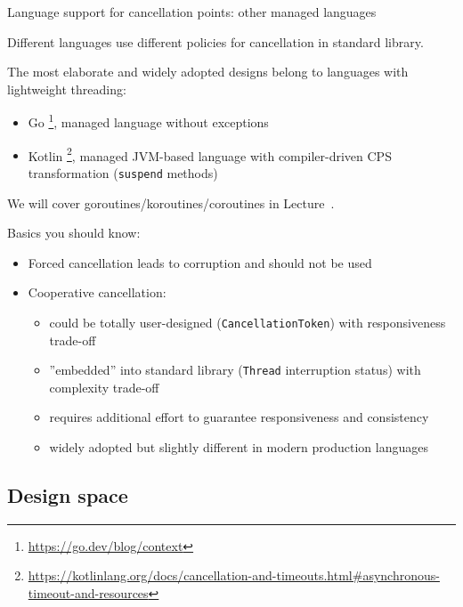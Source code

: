 \begin{frame}[t]{Language support for cancellation points: other managed languages}

Different languages use different policies for cancellation in standard library.

\pause

The most elaborate and widely adopted designs belong to languages with lightweight threading:
\begin{itemize}
    \item Go \footnote{\tiny\url{https://go.dev/blog/context}}, managed language without exceptions
    \item Kotlin \footnote{\tiny\url{https://kotlinlang.org/docs/cancellation-and-timeouts.html#asynchronous-timeout-and-resources}}, managed JVM-based language with compiler-driven CPS transformation (\texttt{suspend} methods)
\end{itemize}

\pause

We will cover goroutines/koroutines/coroutines in Lecture~\userSpaceThreadingNum.

\pause

Basics you should know:
\begin{itemize}
    \item Forced cancellation leads to corruption and should not be used
    \item Cooperative cancellation:
    \begin{itemize}
      \item could be totally user-designed (\texttt{CancellationToken}) with responsiveness trade-off
      \item ''embedded'' into standard library (\texttt{Thread} interruption status) with complexity trade-off
      \item requires additional effort to guarantee responsiveness and consistency
      \item widely adopted but slightly different in modern production languages
    \end{itemize}
\end{itemize}
\end{frame}


\subsection{Design space}
\showTOCSub

